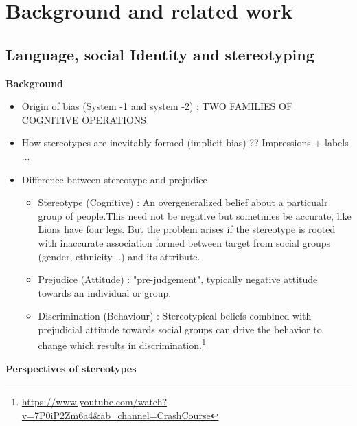 \chapter{Background and related work}

\section{Language, social Identity and stereotyping}

\textbf{Background}
\begin{itemize}
    \item Origin of bias (System -1 and system -2) ; TWO FAMILIES OF COGNITIVE OPERATIONS \cite{kahneman2002representativeness}
    \item  How stereotypes are inevitably formed (implicit bias) ??
    Impressions + labels ...
    \cite{fiske1998stereotyping}
    \item Difference between stereotype and prejudice \cite{fiske1998stereotyping}
    \begin{itemize}
        \item Stereotype (Cognitive) : An overgeneralized belief about a particualr group of people.This need not be negative but sometimes be accurate, like Lions have four legs. But the problem arises if the stereotype is rooted with inaccurate association formed between target from social groups (gender, ethnicity ..) and its attribute. 
        \item Prejudice (Attitude) : "pre-judgement", typically negative attitude towards an individual or group.
        \item Discrimination (Behaviour) : Stereotypical beliefs combined with prejudicial attitude towards social groups can drive the behavior to change which results in discrimination.\label{crashcrouse}\footnote {\url{https://www.youtube.com/watch?v=7P0iP2Zm6a4&ab_channel=CrashCourse}}
    \end{itemize}
\end{itemize}
\textbf{Perspectives of stereotypes}
